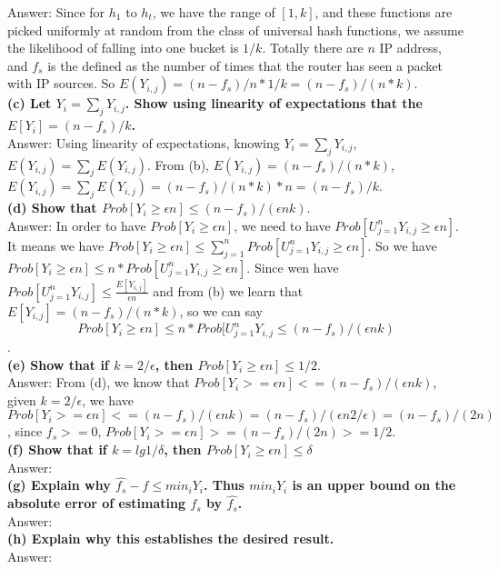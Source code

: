 \documentclass{article}
\begin{document}
Answer: Since for $h_1$ to $h_t$, we have the range of $[1,k]$, and these functions are picked uniformly at random from the class of universal hash functions, we assume the likelihood of falling into one bucket is $1/k$. Totally there are $n$ IP address, and $f_s$ is the defined as the number of times that the router has seen a packet with IP sources. So $E(Y_{i,j}) =(n-f_s)/n * 1/k = (n-f_s)/(n*k)$.\\ \newline
\textbf{(c) Let $Y_i = \sum_jY_{i,j}$. Show using linearity of expectations that the $E[Y_i] = (n - f_s)/k$.} \\ \newline
Answer: Using linearity of expectations, knowing $Y_i = \sum_{j} Y_{i,j}$, $E(Y_{i,j}) =  \sum_{j} E(Y_{i,j})$. From (b), $E(Y_{i,j}) = (n-f_s)/(n*k)$,  $E(Y_{i,j}) =  \sum_{j} E(Y_{i,j}) =(n-f_s)/(n*k) * n =  (n-f_s)/k$.\\ \newline
\textbf{(d) Show that $Prob[Y_i \geq \epsilon n] \leq (n - f_s)/(\epsilon nk)$}. \\ \newline
Answer: In order to have $Prob[Y_i \geq \epsilon n]$, we need to have $Prob[U_{j=1}^{n}Y_{i,j}\geq \epsilon n]$. It means we have $Prob[Y_i \geq \epsilon n]\leq \sum_{j=1}^{n}Prob[U_{j=1}^{n}Y_{i,j}\geq \epsilon n]$. So we have $Prob[Y_i \geq \epsilon n]\leq n*Prob[U_{j=1}^{n}Y_{i,j}\geq \epsilon n]$. Since wen have $Prob[U_{j=1}^{n}Y_{i,j}] \leq \frac{E[Y_{i,j}]}{\epsilon n}$ and from (b) we learn that $E[Y_{i,j}] = (n - f_s)/(n*k)$, so we can say $$Prob[Y_i \geq \epsilon n]\leq n*Prob[U_{j=1}^{n}Y_{i,j} \leq (n - f_s)/(\epsilon nk)$$.\\ \newline
\textbf{(e) Show that if $k = 2/\epsilon$, then $Prob[Y_i \geq \epsilon n] \leq 1/2$}. \\ \newline
Answer: From (d), we know that $Prob[Y_i>=\epsilon n] <= (n-f_s)/(\epsilon nk)$, given $k = 2/\epsilon$, we have $Prob[Y_i>=\epsilon n] <= (n-f_s)/(\epsilon nk) = (n-f_s)/(\epsilon n 2/\epsilon) = (n-f_s)/(2n)$, since $f_s>=0$,  $Prob[Y_i>=\epsilon n] > = (n-f_s)/(2n) >=1/2$.\\ \newline
\textbf{(f) Show that if $k = lg1/\delta$, then $Prob[Y_i \geq \epsilon n] \leq \delta$} \\ \newline
Answer: \\ \newline
\textbf{(g) Explain why $\hat{f_{s}} - f \leq min_i Y_i$. Thus $min_i Y_i$ is an upper bound on the absolute error of estimating $f_s$ by $\hat{f_{s}}$.} \\ \newline
Answer: \\ \newline
\textbf{(h) Explain why this establishes the desired result.} \\ \newline
Answer:\\ \newline
\end{document}
